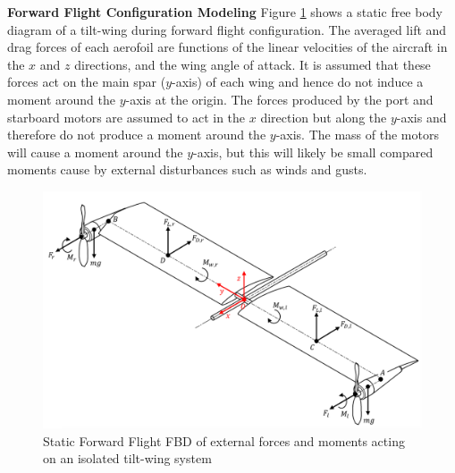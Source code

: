 \textbf{Forward Flight Configuration Modeling}
Figure \ref{fig:FFFBD} shows a static free body diagram of a tilt-wing during forward flight configuration. The averaged lift and drag forces of each aerofoil are functions of the linear velocities of the aircraft in the $x$ and $z$ directions, and the wing angle of attack. It is assumed that these forces act on the main spar ($y$-axis) of each wing and hence do not induce a moment around the $y$-axis at the origin. The forces produced by the port and starboard motors are assumed to act in the $x$ direction but along the $y$-axis and therefore do not produce a moment around the $y$-axis. The mass of the motors will cause a moment around the $y$-axis, but this will likely be small compared moments cause by external disturbances such as winds and gusts.\\
\begin{figure}[H]
    \centering
    \includegraphics[width = \textwidth]{Tiltwing/FFFBD.png}
    \caption[Static Forward Flight FBD]{Static Forward Flight FBD of external forces and moments acting on an isolated tilt-wing system}
    \label{fig:FFFBD}
\end{figure}

